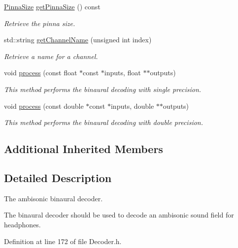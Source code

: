 \begin{DoxyCompactItemize}
\hyperlink{class_hoa2_d_1_1_decoder_binaural_a29505dfc8fda1797dc2b059530f2383a}{Pinna\-Size} \hyperlink{class_hoa2_d_1_1_decoder_binaural_a3643f09471c58432e188693c839dd954}{get\-Pinna\-Size} () const 
\begin{DoxyCompactList}\small\item\em Retrieve the pinna size. \end{DoxyCompactList}\item 
std\-::string \hyperlink{class_hoa2_d_1_1_decoder_binaural_a045e4d443418211eca3074e10719ecd5}{get\-Channel\-Name} (unsigned int index)
\begin{DoxyCompactList}\small\item\em Retrieve a name for a channel. \end{DoxyCompactList}\item 
void \hyperlink{class_hoa2_d_1_1_decoder_binaural_accbfe84ed3e43f1e9ca93e58edb7020f}{process} (const float $\ast$const $\ast$inputs, float $\ast$$\ast$outputs)
\begin{DoxyCompactList}\small\item\em This method performs the binaural decoding with single precision. \end{DoxyCompactList}\item 
void \hyperlink{class_hoa2_d_1_1_decoder_binaural_afab13c873d9c9b1a883bcc993ec0ec35}{process} (const double $\ast$const $\ast$inputs, double $\ast$$\ast$outputs)
\begin{DoxyCompactList}\small\item\em This method performs the binaural decoding with double precision. \end{DoxyCompactList}\end{DoxyCompactItemize}
\subsection*{Additional Inherited Members}


\subsection{Detailed Description}
The ambisonic binaural decoder. 

The binaural decoder should be used to decode an ambisonic sound field for headphones. 

Definition at line 172 of file Decoder.\-h.



